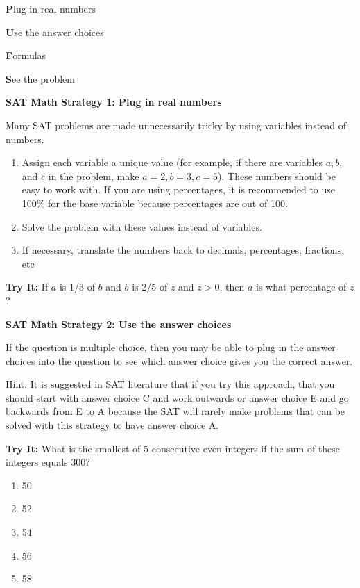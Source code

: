 \vfill
\textbf{\sffamily\large P}lug in real numbers

\bigskip
\textbf{\sffamily\large U}se the answer choices

\bigskip
\textbf{\sffamily\large F}ormulas

\bigskip
\textbf{\sffamily\large S}ee the problem

\vfill
\dotfill

\bigskip
\textbf{\large\sffamily SAT Math Strategy 1: Plug in real numbers}

\bigskip
Many SAT problems are made unnecessarily tricky by using variables instead of numbers.

\begin{enumerate}
\item Assign each variable a unique value (for example, if there are variables $a, b$, and $c$ in the problem, make $a=2, b=3, c=5$). These numbers should be easy to work with. If you are using percentages, it is recommended to use 100\% for the base variable because percentages are out of 100.
\vfill\item Solve the problem with these values instead of variables.
\vfill\item If necessary, translate the numbers back to decimals, percentages, fractions, etc
\end{enumerate}

\vfill
\textbf{Try It:} If $a$ is 1/3 of $b$ and $b$ is 2/5 of $z$ and $z>0$, then $a$ is what percentage of $z$?

\vfill
\newpage
\textbf{\large\sffamily SAT Math Strategy 2: Use the answer choices}

If the question is multiple choice, then you may be able to plug in the answer choices into the question to see which answer choice gives you the correct answer.

\bigskip
Hint: It is suggested in SAT literature that if you try this approach, that you should start with answer choice C and work outwards or answer choice E and go backwards from E to A because the SAT will rarely make problems that can be solved with this strategy to have answer choice A. 

\bigskip
\textbf{Try It:} What is the smallest of 5 consecutive even integers if the sum of these integers equals 300?

\begin{enumerate}[label=(\Alph*)]
\item 50
\item 52
\item 54
\item 56
\item 58
\end{enumerate}

